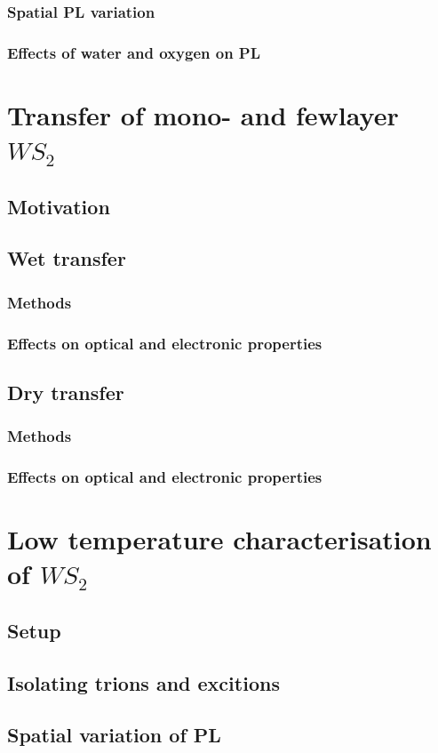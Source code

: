 \documentclass[12pt]{article}
\begin{document}
		\subsubsection{Spatial PL variation}
		\subsubsection{Effects of water and oxygen on PL}
\section{Transfer of mono- and fewlayer $WS_2$}
	\subsection{Motivation}
	\subsection{Wet transfer}
		\subsubsection{Methods}
		\subsubsection{Effects on optical and electronic properties}
	\subsection{Dry transfer}
		\subsubsection{Methods}
		\subsubsection{Effects on optical and electronic properties}
\section{Low temperature characterisation of $WS_2$}
	\subsection{Setup}
	\subsection{Isolating trions and excitions}
	\subsection{Spatial variation of PL}
\end{document}

